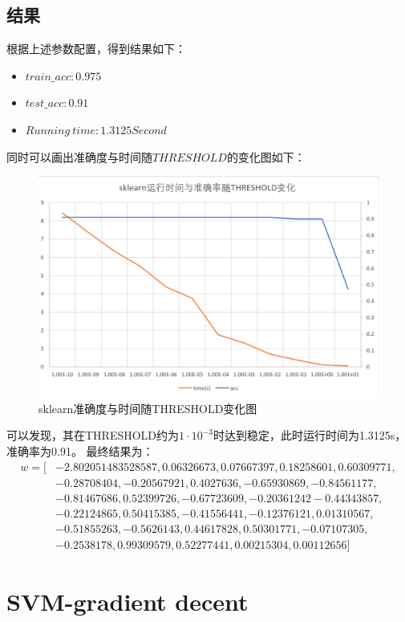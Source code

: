 \documentclass[UTF8]{ctexart}
\begin{document}
\subsection{结果}
根据上述参数配置，得到结果如下：
\begin{itemize}
    \item $train\_acc: 0.975$
    \item $test\_acc: 0.91$
    \item $Running\ time: 1.3125 Second$
\end{itemize}
同时可以画出准确度与时间随$THRESHOLD$的变化图如下：
\begin{figure}[H]
    \centering
    \includegraphics[scale=0.6]{./img/sklearn.png}
    \caption{sklearn准确度与时间随THRESHOLD变化图}
\end{figure}
可以发现，其在THRESHOLD约为$1 \cdot 10^{-3}$时达到稳定，此时运行时间为1.3125s，准确率为0.91。
最终结果为：
\begin{align}
    w=[&-2.802051483528587,0.06326673,0.07667397,0.18258601,0.60309771,\nonumber\\
    &-0.28708404,-0.20567921,0.4027636,-0.65930869,-0.84561177,\nonumber\\
    &-0.81467686,0.52399726,-0.67723609,-0.20361242 -0.44343857,\nonumber\\
    &-0.22124865,0.50415385,-0.41556441,-0.12376121,0.01310567,\nonumber\\
    &-0.51855263,-0.5626143,0.44617828,0.50301771,-0.07107305,\nonumber\\
    &-0.2538178,0.99309579,0.52277441,0.00215304,0.00112656]\nonumber
\end{align}

\section{SVM-gradient decent}
\end{document}
